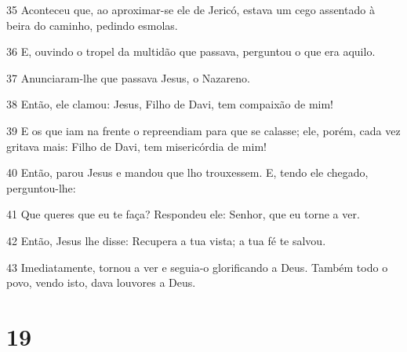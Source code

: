 \par 35 Aconteceu que, ao aproximar-se ele de Jericó, estava um cego assentado à beira do caminho, pedindo esmolas.
\par 36 E, ouvindo o tropel da multidão que passava, perguntou o que era aquilo.
\par 37 Anunciaram-lhe que passava Jesus, o Nazareno.
\par 38 Então, ele clamou: Jesus, Filho de Davi, tem compaixão de mim!
\par 39 E os que iam na frente o repreendiam para que se calasse; ele, porém, cada vez gritava mais: Filho de Davi, tem misericórdia de mim!
\par 40 Então, parou Jesus e mandou que lho trouxessem. E, tendo ele chegado, perguntou-lhe:
\par 41 Que queres que eu te faça? Respondeu ele: Senhor, que eu torne a ver.
\par 42 Então, Jesus lhe disse: Recupera a tua vista; a tua fé te salvou.
\par 43 Imediatamente, tornou a ver e seguia-o glorificando a Deus. Também todo o povo, vendo isto, dava louvores a Deus.

\chapter{19}

